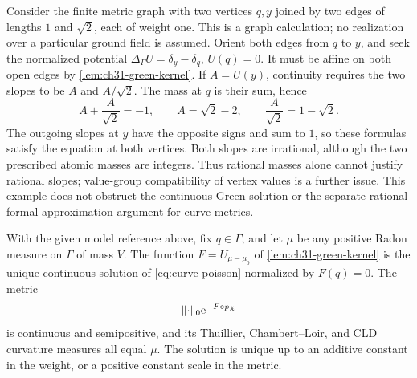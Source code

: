 \begin{example}
\label{ex:ch31-rational-mass-irrational-slope}
Consider the finite metric graph with two vertices \(q,y\) joined by
two edges of lengths \(1\) and \(\sqrt{2}\), each of weight one.
This is a graph calculation; no realization over a particular
ground field is assumed.  Orient both edges from \(q\) to \(y\),
and seek the normalized potential
\(\Delta_\Gamma U=\delta_y-\delta_q\), \(U(q)=0\).
It must be affine on both open edges by
\cref{lem:ch31-green-kernel}.  If \(A=U(y)\), continuity requires
the two slopes to be \(A\) and \(A/\sqrt{2}\).
The mass at \(q\) is their sum, hence
\[
        A+\frac{A}{\sqrt{2}}=-1,
        \qquad
        A=\sqrt{2}-2,\qquad
        \frac{A}{\sqrt{2}}=1-\sqrt{2}.
\]
The outgoing slopes at \(y\) have the opposite signs and sum to \(1\),
so these formulas satisfy the equation at both vertices.
Both slopes are irrational, although the two prescribed atomic
masses are integers.  Thus rational masses alone cannot justify
rational slopes; value-group compatibility of vertex values is
a further issue.  This example does not obstruct the continuous
Green solution or the separate rational formal approximation
argument for curve metrics.
\end{example}

\begin{proposition}
\label{prop:graph-ma-solution}
With the given model reference above, fix \(q\in\Gamma\), and let
\(\mu\) be any positive Radon measure on \(\Gamma\) of mass \(V\).  The function
\(F=U_{\mu-\mu_0}\) of \cref{lem:ch31-green-kernel} is the unique
continuous solution of \eqref{eq:curve-poisson} normalized by \(F(q)=0\).
The metric
\[
             \lVert\cdot\rVert_0\mathrm e^{-F\circ p_{\mathfrak X}}
\]
is continuous and semipositive, and its Thuillier, Chambert--Loir,
and CLD curvature measures all equal \(\mu\).
The solution is unique up to an additive constant in the weight,
or a positive constant scale in the metric.
\end{proposition}

